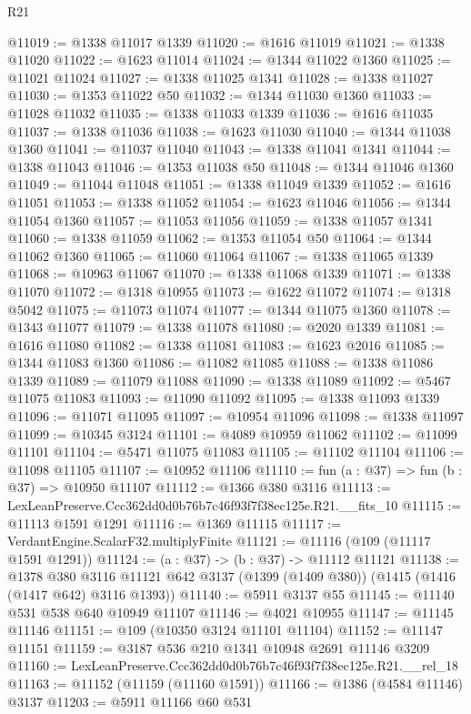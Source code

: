 \begin{lexlean}{R21}
\begin{coremodule}
@11019 := @1338 @11017 @1339
@11020 := @1616 @11019
@11021 := @1338 @11020
@11022 := @1623 @11014
@11024 := @1344 @11022 @1360
@11025 := @11021 @11024
@11027 := @1338 @11025 @1341
@11028 := @1338 @11027
@11030 := @1353 @11022 @50
@11032 := @1344 @11030 @1360
@11033 := @11028 @11032
@11035 := @1338 @11033 @1339
@11036 := @1616 @11035
@11037 := @1338 @11036
@11038 := @1623 @11030
@11040 := @1344 @11038 @1360
@11041 := @11037 @11040
@11043 := @1338 @11041 @1341
@11044 := @1338 @11043
@11046 := @1353 @11038 @50
@11048 := @1344 @11046 @1360
@11049 := @11044 @11048
@11051 := @1338 @11049 @1339
@11052 := @1616 @11051
@11053 := @1338 @11052
@11054 := @1623 @11046
@11056 := @1344 @11054 @1360
@11057 := @11053 @11056
@11059 := @1338 @11057 @1341
@11060 := @1338 @11059
@11062 := @1353 @11054 @50
@11064 := @1344 @11062 @1360
@11065 := @11060 @11064
@11067 := @1338 @11065 @1339
@11068 := @10963 @11067
@11070 := @1338 @11068 @1339
@11071 := @1338 @11070
@11072 := @1318 @10955
@11073 := @1622 @11072
@11074 := @1318 @5042
@11075 := @11073 @11074
@11077 := @1344 @11075 @1360
@11078 := @1343 @11077
@11079 := @1338 @11078
@11080 := @2020 @1339
@11081 := @1616 @11080
@11082 := @1338 @11081
@11083 := @1623 @2016
@11085 := @1344 @11083 @1360
@11086 := @11082 @11085
@11088 := @1338 @11086 @1339
@11089 := @11079 @11088
@11090 := @1338 @11089
@11092 := @5467 @11075 @11083
@11093 := @11090 @11092
@11095 := @1338 @11093 @1339
@11096 := @11071 @11095
@11097 := @10954 @11096
@11098 := @1338 @11097
@11099 := @10345 @3124
@11101 := @4089 @10959 @11062
@11102 := @11099 @11101
@11104 := @5471 @11075 @11083
@11105 := @11102 @11104
@11106 := @11098 @11105
@11107 := @10952 @11106
@11110 := fun (a : @37) => fun (b : @37) => @10950 @11107
@11112 := @1366 @380 @3116
@11113 := LexLeanPreserve.Ccc362dd0d0b76b7c46f93f7f38ec125e.R21.__fits_10
@11115 := @11113 @1591 @1291
@11116 := @1369 @11115
@11117 := VerdantEngine.ScalarF32.multiplyFinite
@11121 := @11116 (@109 (@11117 @1591 @1291))
@11124 := (a : @37) -> (b : @37) -> @11112 @11121
@11138 := @1378
    @380
    @3116
    @11121
    @642
    @3137
    (@1399 (@1409 @380))
    (@1415 (@1416 (@1417 @642) @3116 @1393))
@11140 := @5911 @3137 @55
@11145 := @11140 @531 @538 @640 @10949 @11107
@11146 := @4021 @10955
@11147 := @11145 @11146
@11151 := @109 (@10350 @3124 @11101 @11104)
@11152 := @11147 @11151
@11159 := @3187 @536 @210 @1341 @10948 @2691 @11146 @3209
@11160 := LexLeanPreserve.Ccc362dd0d0b76b7c46f93f7f38ec125e.R21.__rel_18
@11163 := @11152 (@11159 (@11160 @1591))
@11166 := @1386 (@4584 @11146) @3137
@11203 := @5911
    @11166
    @60
    @531

\end{coremodule}
\end{lexlean}
